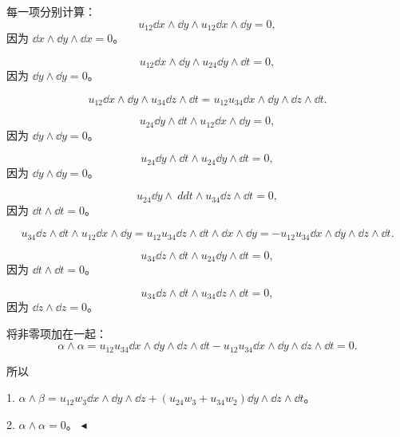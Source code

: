 \documentclass[11pt]{article}
\newenvironment{question}[2][Question]{\begin{trivlist}
\item[\hskip \labelsep {\bfseries #1}\hskip \labelsep {\bfseries #2.}]}{\hfill$\blacktriangleleft$\end{trivlist}}
\begin{document}
\begin{question}{3 (15') (外积)}
    每一项分别计算：
    \[
    u_{12} \dd{x} \wedge \dd{y} \wedge u_{12} \dd{x} \wedge \dd{y} = 0,
    \]
    因为 \(\dd{x} \wedge \dd{y} \wedge \dd{x} = 0\)。
    
    \[
    u_{12} \dd{x} \wedge \dd{y} \wedge u_{24} \dd{y} \wedge \dd{t} = 0,
    \]
    因为 \(\dd{y} \wedge \dd{y} = 0\)。
    
    \[
    u_{12} \dd{x} \wedge \dd{y} \wedge u_{34} \dd{z} \wedge \dd{t} = u_{12} u_{34} \dd{x} \wedge \dd{y} \wedge \dd{z} \wedge \dd{t}.
    \]
    
    \[
    u_{24} \dd{y} \wedge \dd{t} \wedge u_{12} \dd{x} \wedge \dd{y} = 0,
    \]
    因为 \(\dd{y} \wedge \dd{y} = 0\)。
    
    \[
    u_{24} \dd{y} \wedge \dd{t} \wedge u_{24} \dd{y} \wedge \dd{t} = 0,
    \]
    因为 \(\dd{y} \wedge \dd{y} = 0\)。
    
    \[
    u_{24} \dd{y} \wedge \
    dd{t} \wedge u_{34} \dd{z} \wedge \dd{t} = 0,
    \]
    因为 \(\dd{t} \wedge \dd{t} = 0\)。
    
    \[
    u_{34} \dd{z} \wedge \dd{t} \wedge u_{12} \dd{x} \wedge \dd{y} = u_{12} u_{34} \dd{z} \wedge \dd{t} \wedge \dd{x} \wedge \dd{y} = -u_{12} u_{34} \dd{x} \wedge \dd{y} \wedge \dd{z} \wedge \dd{t}.
    \]
    
    \[
    u_{34} \dd{z} \wedge \dd{t} \wedge u_{24} \dd{y} \wedge \dd{t} = 0,
    \]
    因为 \(\dd{t} \wedge \dd{t} = 0\)。
    
    \[
    u_{34} \dd{z} \wedge \dd{t} \wedge u_{34} \dd{z} \wedge \dd{t} = 0,
    \]
    因为 \(\dd{z} \wedge \dd{z} = 0\)。
    
    将非零项加在一起：
    \[
    \alpha \wedge \alpha = u_{12} u_{34} \dd{x} \wedge \dd{y} \wedge \dd{z} \wedge \dd{t} - u_{12} u_{34} \dd{x} \wedge \dd{y} \wedge \dd{z} \wedge \dd{t} = 0.
    \]
    
    所以
    
    1. \(\alpha \wedge \beta = u_{12} w_3 \dd{x} \wedge \dd{y} \wedge \dd{z} + (u_{24} w_3 + u_{34} w_2) \dd{y} \wedge \dd{z} \wedge \dd{t}\)。
    
    2. \(\alpha \wedge \alpha = 0\)。
    \end{question}
\end{document}
